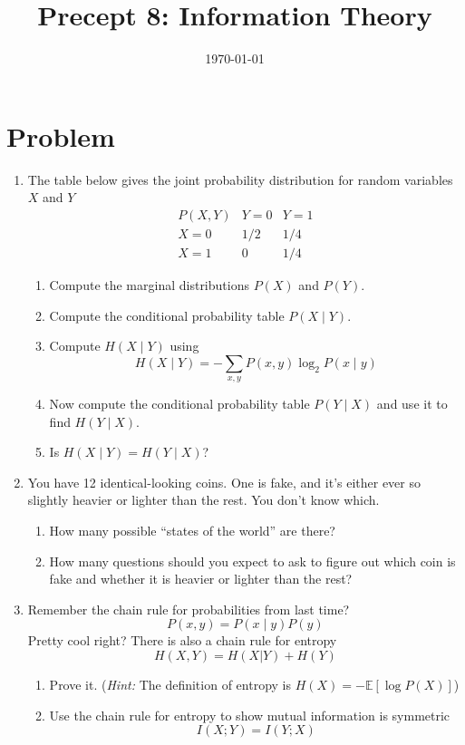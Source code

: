 \documentclass[11pt]{article}
\title{Precept 8: Information Theory}
\date{\today}
\begin{document}
\maketitle
\thispagestyle{fancy}

\section*{Problem}
\begin{enumerate}
    \item The table below gives the joint probability distribution for random variables $X$ and $Y$
    \[
    \begin{array}{c|cc}
    P(X,Y) & Y=0 & Y=1 \\ \hline
    X=0 & 1/2 & 1/4 \\
    X=1 & 0 & 1/4
    \end{array}
    \]
    \begin{enumerate}
        \item Compute the marginal distributions $P(X)$ and $P(Y)$.
        \item Compute the conditional probability table $P(X\mid Y)$.
        \item Compute $H(X\mid Y)$ using \[ H(X\mid Y)=-\sum_{x,y}P(x,y)\log_2 P(x\mid y) \]
        \item Now compute the conditional probability table $P(Y\mid X)$ and use it to find $H(Y\mid X)$.
        \item Is $H(X\mid Y)=H(Y\mid X)$?
    \end{enumerate}
 
    \item You have 12 identical-looking coins. One is fake, and it's either ever so slightly heavier or lighter than the rest. You don't know which.
    \begin{enumerate}
        \item How many possible ``states of the world'' are there?
        \item How many questions should you expect to ask to figure out which coin is fake and whether it is heavier or lighter than the rest?
    \end{enumerate}

    \item Remember the chain rule for probabilities from last time? \[ P(x,y)=P(x\mid y)P(y) \] Pretty cool right? There is also a chain rule for entropy \[ H(X,Y) = H(X|Y) + H(Y) \]
    \begin{enumerate}
        \item Prove it. (\textit{Hint:} The definition of entropy is $H(X) = -\mathbb{E}\left[\log P(X)\right]$)
        \item Use the chain rule for entropy to show mutual information is symmetric \[I(X;Y)=I(Y;X)\]
    \end{enumerate}
\end{enumerate}
\newpage
\end{document}

